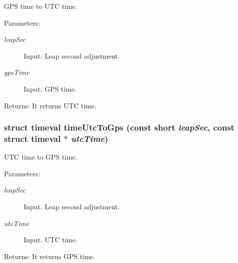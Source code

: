 GPS time to UTC time. 

\begin{Desc}
\item[Parameters:]
\begin{description}
\item[{\em leapSec}]Input. Leap second adjustment. \item[{\em gpsTime}]Input. GPS time.\end{description}
\end{Desc}
\begin{Desc}
\item[Returns:]It returns UTC time. \end{Desc}
\hypertarget{group__time__conv_gd96aa6054228a1751cc4361c09faf60c}{
\subsubsection[timeUtcToGps]{\setlength{\rightskip}{0pt plus 5cm}struct timeval timeUtcToGps (const short {\em leapSec}, \/  const struct timeval $\ast$ {\em utcTime})}}
\label{group__time__conv_gd96aa6054228a1751cc4361c09faf60c}


UTC time to GPS time. 

\begin{Desc}
\item[Parameters:]
\begin{description}
\item[{\em leapSec}]Input. Leap second adjustment. \item[{\em utcTime}]Input. UTC time.\end{description}
\end{Desc}
\begin{Desc}
\item[Returns:]It returns GPS time. \end{Desc}
